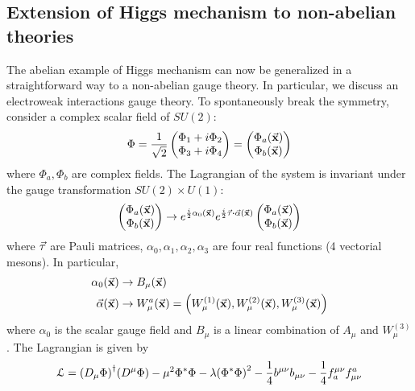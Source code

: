 \documentclass[../main/main.tex]{subfiles}
\begin{document}
\subsection{Extension of Higgs mechanism to non-abelian theories}
The abelian example of Higgs mechanism can now be generalized in a straightforward way to a non-abelian gauge theory. In particular, we discuss an electroweak interactions gauge theory.
To spontaneously break the symmetry, consider a complex scalar field of \( SU(2) \):
\begin{equation}
  \Phi = \frac{1}{\sqrt{2} } \begin{pmatrix}
  \Phi _1 + i \Phi _2 \\
  \Phi _3 + i \Phi _4
  \end{pmatrix}
  =
  \begin{pmatrix}
  \Phi _a (\va{x}) \\
  \Phi _b (\va{x})
  \end{pmatrix}
\end{equation}
where \( \Phi _a, \Phi _b \) are complex fields. The Lagrangian of the system is invariant under the gauge transformation \( SU(2) \times U(1) \):
\begin{equation*}
  \begin{pmatrix}
  \Phi _a (\va{x}) \\
  \Phi _b (\va{x})
  \end{pmatrix}
  \rightarrow
  e^{\frac{i}{2} \alpha _0 (\va{x})} e^{\frac{i}{2} \va{\tau } \vdot \va{\alpha } (\va{x})}
  \begin{pmatrix}
  \Phi _a (\va{x}) \\
  \Phi _b (\va{x})
  \end{pmatrix}
\end{equation*}
where \( \va{\tau } \) are Pauli matrices, \( \alpha _0, \alpha _1, \alpha _2, \alpha_3 \) are four real functions (4 vectorial mesons). In particular,
\begin{subequations}
\begin{align*}
  \alpha _0 (\va{x}) & \rightarrow B _ \mu (\va{x}) \\
   \va{\alpha } (\va{x}) & \rightarrow W _ \mu ^ a (\va{x}) = \qty( W_ \mu ^{(1)} (\va{x}),  W_ \mu ^{(2)} (\va{x}),  W_ \mu ^{(3)} (\va{x}) )
\end{align*}
\end{subequations}
where \( \alpha _0 \) is the scalar gauge field and \( B _ \mu  \) is a linear combination of \( A_ \mu  \) and \(  W_ \mu ^{(3)}  \).
The  Lagrangian is given by
\begin{equation}
  \mathcal{L} = \qty(D_ \mu \Phi )^\dagger \qty(D ^ \mu \Phi ) - \mu ^2 \Phi ^* \Phi - \lambda \qty(\Phi ^* \Phi )^2
  - \frac{1}{4} b^{\mu \nu } b_{\mu \nu } - \frac{1}{4} f_a^{\mu \nu } f_{\mu \nu }^a
\end{equation}
\end{document}
